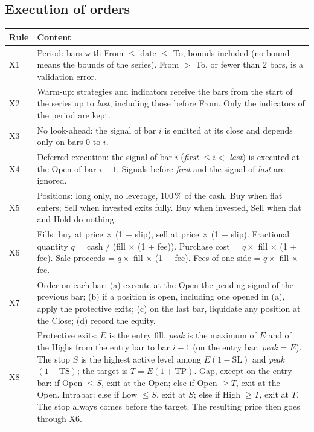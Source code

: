 \documentclass[11pt,a4paper]{article}
\begin{document}
\subsection*{Execution of orders}
\begin{longtable}{@{}p{0.9cm}p{14.8cm}@{}}
\toprule
\textbf{Rule} & \textbf{Content} \\
\midrule
\endhead
X1 & Period: bars with From $\leq$ date $\leq$ To, bounds included (no bound means the bounds of the series). From $>$ To, or fewer than 2 bars, is a validation error. \\
X2 & Warm-up: strategies and indicators receive the bars from the start of the series up to \textit{last}, including those before From. Only the indicators of the period are kept. \\
X3 & No look-ahead: the signal of bar $i$ is emitted at its close and depends only on bars $0$ to $i$. \\
X4 & Deferred execution: the signal of bar $i$ (\textit{first} $\leq i <$ \textit{last}) is executed at the Open of bar $i+1$. Signals before \textit{first} and the signal of \textit{last} are ignored. \\
X5 & Positions: long only, no leverage, 100\,\% of the cash. Buy when flat enters; Sell when invested exits fully. Buy when invested, Sell when flat and Hold do nothing. \\
X6 & Fills: buy at price $\times$ (1 + slip), sell at price $\times$ (1 $-$ slip). Fractional quantity $q$ = cash / (fill $\times$ (1 + fee)). Purchase cost = $q \times$ fill $\times$ (1 + fee). Sale proceeds = $q \times$ fill $\times$ (1 $-$ fee). Fees of one side = $q \times$ fill $\times$ fee. \\
X7 & Order on each bar: (a) execute at the Open the pending signal of the previous bar; (b) if a position is open, including one opened in (a), apply the protective exits; (c) on the last bar, liquidate any position at the Close; (d) record the equity. \\
X8 & Protective exits: $E$ is the entry fill. \textit{peak} is the maximum of $E$ and of the Highs from the entry bar to bar $i-1$ (on the entry bar, \textit{peak} = $E$). The stop $S$ is the highest active level among $E(1-\text{SL})$ and \textit{peak}$(1-\text{TS})$; the target is $T = E(1+\text{TP})$. Gap, except on the entry bar: if Open $\leq S$, exit at the Open; else if Open $\geq T$, exit at the Open. Intrabar: else if Low $\leq S$, exit at $S$; else if High $\geq T$, exit at $T$. The stop always comes before the target. The resulting price then goes through X6. \\

\end{longtable}
\end{document}
